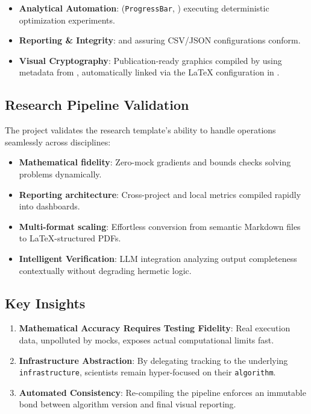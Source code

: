 \documentclass[
  english,
]{article}
\providecommand{\tightlist}{%
  \setlength{\itemsep}{0pt}\setlength{\parskip}{0pt}}
\begin{document}
\begin{itemize}
\tightlist
\item
  \textbf{Analytical Automation}: 
  (\texttt{ProgressBar}, ) executing
  deterministic optimization experiments.
\item
  \textbf{Reporting \& Integrity}:
   and
   assuring CSV/JSON
  configurations conform.
\item
  \textbf{Visual Cryptography}: Publication-ready graphics compiled by
   using metadata from
  ,
  automatically linked via the LaTeX configuration in
  .
\end{itemize}

\subsection{Research Pipeline
Validation}\label{research-pipeline-validation}

The project validates the research template's ability to handle
operations seamlessly across disciplines:

\begin{itemize}
\tightlist
\item
  \textbf{Mathematical fidelity}: Zero-mock gradients and bounds checks
  solving problems dynamically.
\item
  \textbf{Reporting architecture}: Cross-project and local metrics
  compiled rapidly into dashboards.
\item
  \textbf{Multi-format scaling}: Effortless conversion from semantic
  Markdown files to LaTeX-structured PDFs.
\item
  \textbf{Intelligent Verification}: LLM integration analyzing output
  completeness contextually without degrading hermetic logic.
\end{itemize}

\subsection{Key Insights}\label{key-insights}

\begin{enumerate}
\def\labelenumi{\arabic{enumi}.}
\tightlist
\item
  \textbf{Mathematical Accuracy Requires Testing Fidelity}: Real
  execution data, unpolluted by mocks, exposes actual computational
  limits fast.
\item
  \textbf{Infrastructure Abstraction}: By delegating tracking to the
  underlying \texttt{infrastructure}, scientists remain hyper-focused on
  their \texttt{algorithm}.
\item
  \textbf{Automated Consistency}: Re-compiling the pipeline enforces an
  immutable bond between algorithm version and final visual reporting.
\end{enumerate}
\end{document}
